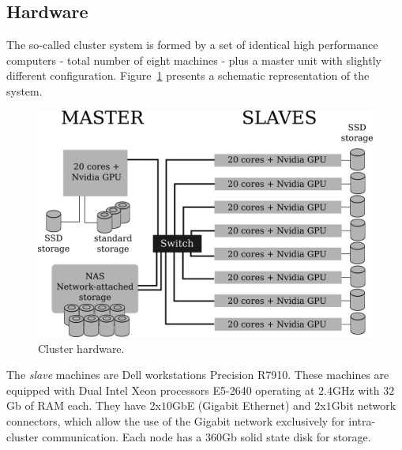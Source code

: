 \documentclass[twoside,a4paper,12pt,english]{inac17}
\begin{document}

\subsection{Hardware}

The so-called cluster system is formed by a set of identical high performance computers -
total number of eight machines - plus a master unit with slightly different configuration.
Figure~\ref{fig:cluster} presents a schematic representation of the system.

\begin{figure}[h] %
  \centering\includegraphics[scale=0.7]{images/cluster-topologico.png}
  \caption{Cluster hardware.}
  \label{fig:cluster}
\end{figure}

The \textit{slave} machines are Dell workstations Precision R7910. These machines are equipped
with Dual Intel{\textregistered} Xeon{\textregistered} processors E5-2640 operating at $2.4$GHz with
$32$Gb of RAM each. They have 2x$10$GbE (Gigabit Ethernet) and 2x$1$Gbit network connectors, which
allow the use of the Gigabit network exclusively for intra-cluster communication. Each node
has a $360$Gb solid state disk for storage.
\end{document}
